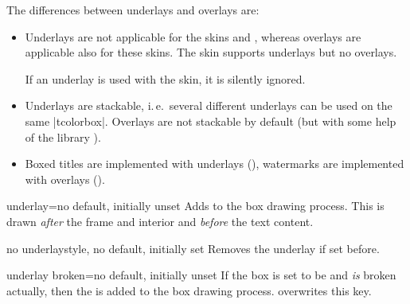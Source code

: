The differences between underlays and overlays are:
\begin{itemize}
\item Underlays are not applicable for the skins
   and
  ,
  whereas overlays are applicable also for these skins.
  The skin  supports underlays but no overlays.
  \begin{marker}
  If an underlay is used with the  skin, it is silently ignored.
  \end{marker}
\item Underlays are stackable, i.\,e.\ several different underlays can be
  used on the same |tcolorbox|. Overlays are not stackable by default (but with
  some help of the library ).
\item Boxed titles are implemented with underlays (),
  watermarks are implemented with overlays ().
\end{itemize}


\begin{docTcbKey}{underlay}{=}{no default, initially unset}
  Adds  to the box drawing process. This 
  is drawn \emph{after} the frame and interior and \emph{before} the text content.
\end{docTcbKey}


\begin{docTcbKey}{no underlay}{}{style, no default, initially set}
  Removes the underlay if set before.
\end{docTcbKey}

\clearpage
\begin{docTcbKey}{underlay broken}{=}{no default, initially unset}
  If the box is set to be  and \emph{is} broken actually,
  then the  is added to the box drawing process.
   overwrites this key.
\end{docTcbKey}

